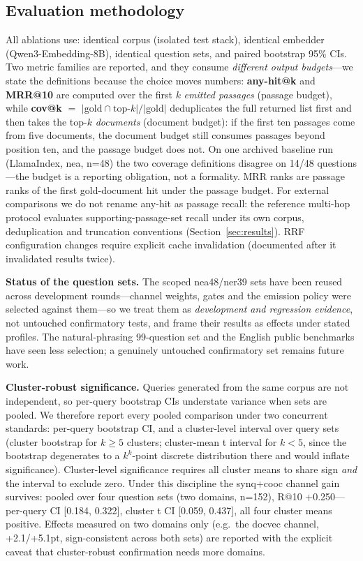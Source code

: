 \documentclass[sigconf,nonacm]{acmart}
\begin{document}
\subsection{Evaluation methodology}

All ablations use: identical corpus (isolated test stack), identical embedder
(Qwen3-Embedding-8B), identical question sets, and paired bootstrap 95\%
CIs. Two metric families are reported, and they consume
\emph{different output budgets}---we state the definitions because the
choice moves numbers: \textbf{any-hit@k} and \textbf{MRR@10} are
computed over the first $k$ \emph{emitted passages} (passage budget),
while \textbf{cov@k} $=$ $|\mathrm{gold} \cap \mathrm{top}\text{-}k| /
|\mathrm{gold}|$ deduplicates the full returned list first and then
takes the top-$k$ \emph{documents} (document budget): if the first ten
passages come from five documents, the document budget still consumes
passages beyond position ten, and the passage budget does not. On one
archived baseline run (LlamaIndex, nea, n=48) the two coverage
definitions disagree on 14/48 questions---the budget is a reporting
obligation, not a formality. MRR ranks are passage ranks of the first
gold-document hit under the passage budget. For external comparisons we
do not rename any-hit as passage recall: the reference multi-hop
protocol evaluates supporting-passage-set recall under its own corpus,
deduplication and truncation conventions
(Section~\ref{sec:results}). RRF configuration changes require explicit
cache invalidation (documented after it invalidated results twice).

\textbf{Status of the question sets.} The scoped nea48/ner39 sets have
been reused across development rounds---channel weights, gates and the
emission policy were selected against them---so we treat them as
\emph{development and regression evidence}, not untouched confirmatory
tests, and frame their results as effects under stated profiles. The
natural-phrasing 99-question set and the English public benchmarks have
seen less selection; a genuinely untouched confirmatory set remains
future work.

\textbf{Cluster-robust significance.} Queries generated from the same corpus
are not independent, so per-query bootstrap CIs understate variance when sets
are pooled. We therefore report every pooled comparison under two concurrent
standards: per-query bootstrap CI, and a cluster-level interval over query
sets (cluster bootstrap for $k\geq5$ clusters; cluster-mean t interval for
$k<5$, since the bootstrap degenerates to a $k^k$-point discrete distribution
there and would inflate significance). Cluster-level significance requires
all cluster means to share sign \emph{and} the interval to exclude zero.
Under this discipline the synq+cooc channel gain survives: pooled over four
question sets (two domains, n=152), R@10 +0.250---per-query CI [0.184,
0.322], cluster t CI [0.059, 0.437], all four cluster means positive.
Effects measured on two domains only (e.g.\ the docvec channel,
+2.1/+5.1pt, sign-consistent across both sets) are reported with the explicit
caveat that cluster-robust confirmation needs more domains.
\end{document}
